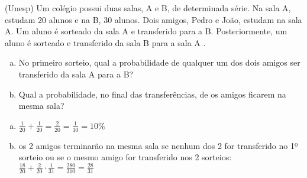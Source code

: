 \begin{ex}
 (Unesp) Um colégio possui duas salas, A e B, de determinada série. Na sala A, estudam 20  alunos e na B, 30 alunos. Dois amigos, Pedro e João, estudam na sala  A. Um aluno é sorteado da sala A  e transferido para a B. Posteriormente, um aluno é sorteado e transferido da sala B  para a sala A .
   \begin{enumerate} [(a)]
       \item No primeiro sorteio, qual a probabilidade de qualquer um dos dois amigos ser transferido da sala A para a B?
       \item Qual a probabilidade, no final das transferências, de os amigos ficarem na mesma sala?
   \end{enumerate}
     \begin{sol}
     \phantom{A}
       \begin{enumerate} [(a)]
           \item $\frac{1}{20}+\frac{1}{20}=\frac{2}{20}=\frac{1}{10}=10\%$
           \item os 2 amigos terminarão na mesma sala se nenhum dos 2 for transferido no 1º sorteio ou se o mesmo amigo for transferido nos 2 sorteios: $\frac{18}{20}+\frac{2}{20}\cdot\frac{1}{31}=\frac{280}{310}=\frac{28}{31}$
       \end{enumerate}
     \end{sol}
\end{ex}